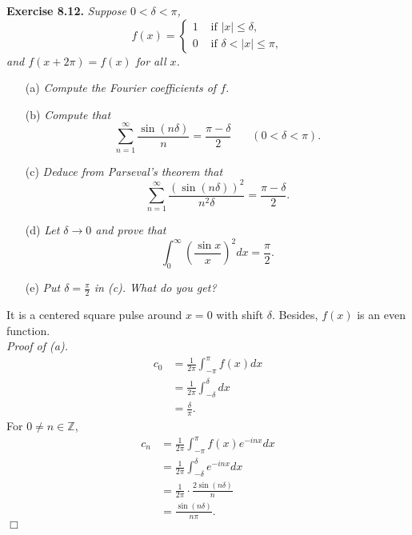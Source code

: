 \documentclass{article}
\begin{document}



\textbf{Exercise 8.12.}
\emph{Suppose $0 < \delta < \pi$,
\begin{equation*}
  f(x) =
    \begin{cases}
      1 & \text{ if } |x| \leq \delta, \\
      0 & \text{ if } \delta < |x| \leq \pi,
    \end{cases}
\end{equation*}
and $f(x + 2\pi) = f(x)$ for all $x$.}

\begin{enumerate}
\item[(a)]
\emph{Compute the Fourier coefficients of $f$.}

\item[(b)]
\emph{Compute that
$$\sum_{n = 1}^{\infty} \frac{\sin(n\delta)}{n} = \frac{\pi - \delta}{2}
\:\:\:\:\:\:\:\:
(0 < \delta < \pi).$$}

\item[(c)]
\emph{Deduce from Parseval's theorem that
$$\sum_{n = 1}^{\infty} \frac{(\sin(n\delta))^2}{n^2 \delta} = \frac{\pi - \delta}{2}.$$}

\item[(d)]
\emph{Let $\delta \rightarrow 0$ and prove that
$$\int_{0}^{\infty} \left( \frac{\sin x}{x} \right)^2 dx
= \frac{\pi}{2}.$$}

\item[(e)]
\emph{Put $\delta = \frac{\pi}{2}$ in (c). What do you get?} \\
\end{enumerate}

It is a centered square pulse around $x = 0$ with shift $\delta$.
Besides, $f(x)$ is an even function. \\

\emph{Proof of (a).}
\begin{align*}
c_0
&= \frac{1}{2 \pi} \int_{-\pi}^\pi f(x) dx \\
&= \frac{1}{2 \pi} \int_{-\delta}^\delta dx \\
&= \frac{\delta}{\pi}.
\end{align*}
For $0 \neq n \in \mathbb{Z}$,
\begin{align*}
c_n
&= \frac{1}{2 \pi} \int_{-\pi}^\pi f(x) e^{-inx} dx \\
&= \frac{1}{2 \pi} \int_{-\delta}^\delta e^{-inx} dx \\
&= \frac{1}{2 \pi} \cdot \frac{2 \sin(n \delta)}{n} \\
&= \frac{\sin(n \delta)}{n \pi}.
\end{align*}
$\Box$ \\
\end{document}

